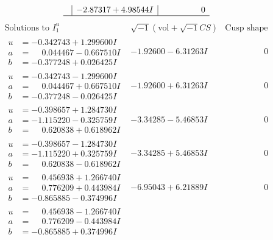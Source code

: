 \documentclass[1p]{elsarticle_modified}
\theoremstyle{definition}
\newcommand{\I}{\sqrt{-1}}
\begin{document}
$$\begin{array}{c|c|c}
 & -2.87317 + 4.98544 I & \phantom{-0.000000 } 0\\
 \hline 
 \end{array}$$\newpage$$\begin{array}{c|c|c}  
\text{Solutions to }I^u_{1}& \I (\text{vol} + \sqrt{-1}CS) & \text{Cusp shape}\\
 \hline 
\begin{aligned}
u &= -0.342743 + 1.299600 I \\
a &= \phantom{-}0.044467 - 0.667510 I \\
b &= -0.377248 + 0.026425 I\end{aligned}
 & -1.92600 - 6.31263 I & \phantom{-0.000000 } 0 \\ \hline\begin{aligned}
u &= -0.342743 - 1.299600 I \\
a &= \phantom{-}0.044467 + 0.667510 I \\
b &= -0.377248 - 0.026425 I\end{aligned}
 & -1.92600 + 6.31263 I & \phantom{-0.000000 } 0 \\ \hline\begin{aligned}
u &= -0.398657 + 1.284730 I \\
a &= -1.115220 - 0.325759 I \\
b &= \phantom{-}0.620838 + 0.618962 I\end{aligned}
 & -3.34285 - 5.46853 I & \phantom{-0.000000 } 0 \\ \hline\begin{aligned}
u &= -0.398657 - 1.284730 I \\
a &= -1.115220 + 0.325759 I \\
b &= \phantom{-}0.620838 - 0.618962 I\end{aligned}
 & -3.34285 + 5.46853 I & \phantom{-0.000000 } 0 \\ \hline\begin{aligned}
u &= \phantom{-}0.456938 + 1.266740 I \\
a &= \phantom{-}0.776209 + 0.443984 I \\
b &= -0.865885 - 0.374996 I\end{aligned}
 & -6.95043 + 6.21889 I & \phantom{-0.000000 } 0 \\ \hline\begin{aligned}
u &= \phantom{-}0.456938 - 1.266740 I \\
a &= \phantom{-}0.776209 - 0.443984 I \\
b &= -0.865885 + 0.374996 I\end{aligned}

\end{array}$$
\end{document}
